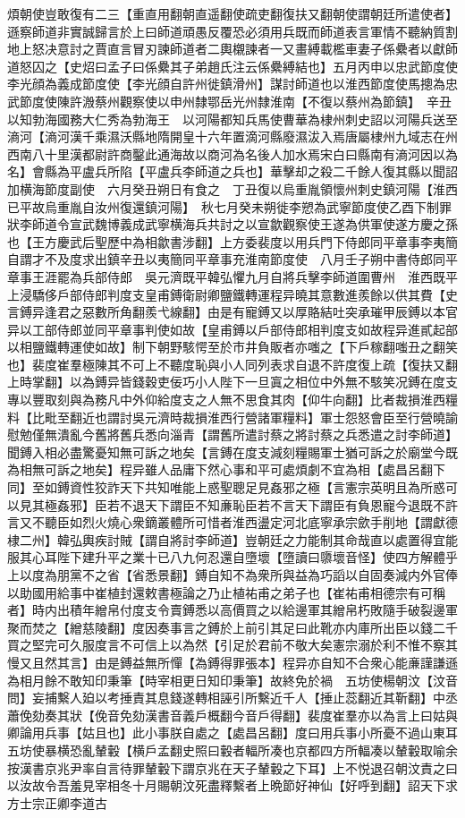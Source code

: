 煩朝使豈敢復有二三【重直用翻朝直遥翻使疏吏翻復扶又翻朝使謂朝廷所遣使者】遜察師道非實誠歸言於上曰師道頑愚反覆恐必須用兵既而師道表言軍情不聽納質割地上怒决意討之賈直言冒刃諫師道者二輿櫬諫者一又畫縛載檻車妻子係纍者以獻師道怒囚之【史炤曰孟子曰係纍其子弟趙氏注云係纍縛結也】五月丙申以忠武節度使李光顔為義成節度使【李光顔自許州徙鎮滑州】謀討師道也以淮西節度使馬摠為忠武節度使陳許溵蔡州觀察使以申州隸鄂岳光州隸淮南【不復以蔡州為節鎮】　辛丑以知勃海國務大仁秀為勃海王　以河陽都知兵馬使曹華為棣州刺史詔以河陽兵送至滳河【滳河漢千乘濕沃縣地隋開皇十六年置滴河縣廢濕沷入焉唐屬棣州九域志在州西南八十里漢都尉許商鑿此通海故以商河為名後人加水焉宋白曰縣南有滳河因以為名】會縣為平盧兵所陷【平盧兵李師道之兵也】華擊却之殺二千餘人復其縣以聞詔加横海節度副使　六月癸丑朔日有食之　丁丑復以烏重胤領懷州刺史鎮河陽【淮西已平故烏重胤自汝州復還鎮河陽】　秋七月癸未朔徙李愬為武寧節度使乙酉下制罪狀李師道令宣武魏博義成武寧横海兵共討之以宣歙觀察使王遂為供軍使遂方慶之孫也【王方慶武后聖歷中為相歙書涉翻】上方委裴度以用兵門下侍郎同平章事李夷簡自謂才不及度求出鎮辛丑以夷簡同平章事充淮南節度使　八月壬子朔中書侍郎同平章事王涯罷為兵部侍郎　吳元濟既平韓弘懼九月自將兵擊李師道圍曹州　淮西既平上浸驕侈戶部侍郎判度支皇甫鎛衛尉卿鹽鐵轉運程异曉其意數進羨餘以供其費【史言鎛异逢君之惡數所角翻羨弋線翻】由是有寵鎛又以厚賂結吐突承璀甲辰鎛以本官异以工部侍郎並同平章事判使如故【皇甫鎛以戶部侍郎相判度支如故程异進貳起部以相鹽鐵轉運使如故】制下朝野駭愕至於市井負販者亦嗤之【下戶稼翻嗤丑之翻笑也】裴度崔羣極陳其不可上不聽度恥與小人同列表求自退不許度復上疏【復扶又翻上時掌翻】以為鎛异皆錢穀吏佞巧小人陛下一旦寘之相位中外無不駭笑况鎛在度支專以豐取刻與為務凡中外仰給度支之人無不思食其肉【仰牛向翻】比者裁損淮西糧料【比毗至翻近也謂討吳元濟時裁損淮西行營諸軍糧料】軍士怨怒會臣至行營曉諭慰勉僅無潰亂今舊將舊兵悉向淄青【謂舊所遣討蔡之將討蔡之兵悉遣之討李師道】聞鎛入相必盡驚憂知無可訴之地矣【言鎛在度支減刻糧賜軍士猶可訴之於廟堂今既為相無可訴之地矣】程异雖人品庸下然心事和平可處煩劇不宜為相【處昌呂翻下同】至如鎛資性狡詐天下共知唯能上惑聖聰足見姦邪之極【言憲宗英明且為所惑可以見其極姦邪】臣若不退天下謂臣不知亷恥臣若不言天下謂臣有負恩寵今退既不許言又不聽臣如烈火燒心衆鏑叢體所可惜者淮西盪定河北底寧承宗歛手削地【謂獻德棣二州】韓弘輿疾討賊【謂自將討李師道】豈朝廷之力能制其命哉直以處置得宜能服其心耳陛下建升平之業十已八九何忍還自墮壞【墮讀曰隳壞音怪】使四方解體乎上以度為朋黨不之省【省悉景翻】鎛自知不為衆所與益為巧謟以自固奏減内外官俸以助國用給事中崔植封還敕書極論之乃止植祐甫之弟子也【崔祐甫相德宗有可稱者】時内出積年繒帛付度支令賣鎛悉以高價買之以給邊軍其繒帛朽敗隨手破裂邊軍聚而焚之【繒慈陵翻】度因奏事言之鎛於上前引其足曰此靴亦内庫所出臣以錢二千買之堅完可久服度言不可信上以為然【引足於君前不敬大矣憲宗溺於利不惟不察其慢又且然其言】由是鎛益無所憚【為鎛得罪張本】程异亦自知不合衆心能亷謹謙遜為相月餘不敢知印秉筆【時宰相更日知印秉筆】故終免於禍　五坊使楊朝汶【汶音問】妄捕繫人廹以考捶責其息錢遂轉相誣引所繫近千人【捶止蕊翻近其靳翻】中丞蕭俛劾奏其狀【俛音免劾漢書音義戶概翻今音戶得翻】裴度崔羣亦以為言上曰姑與卿論用兵事【姑且也】此小事朕自處之【處昌呂翻】度曰用兵事小所憂不過山東耳五坊使暴横恐亂輦轂【横戶孟翻史照曰轂者輻所凑也京都四方所輻凑以輦轂取喻余按漢書京兆尹率自言待罪輦轂下謂京兆在天子輦轂之下耳】上不悦退召朝汶責之曰以汝故令吾羞見宰相冬十月賜朝汶死盡釋繫者上晩節好神仙【好呼到翻】詔天下求方士宗正卿李道古

